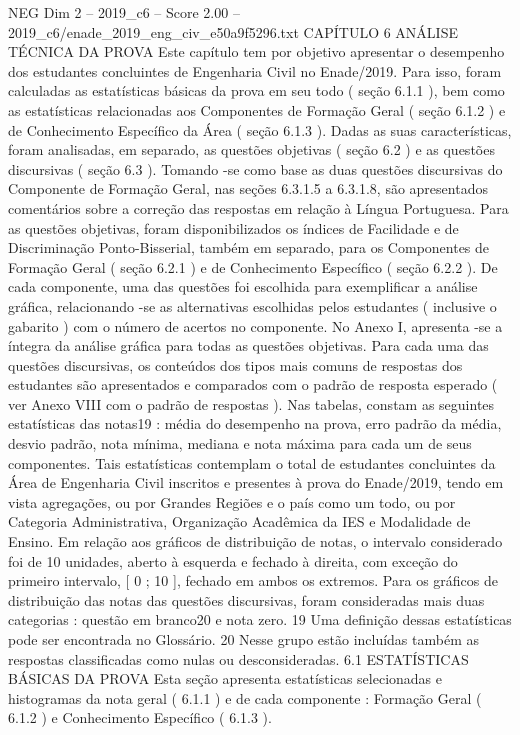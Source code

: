 \begin{textsample}{NEG Dim 2 – 2019\_c6 – Score 2.00 – 2019\_c6/enade\_2019\_eng\_civ\_e50a9f5296.txt}  \label{ex:f2_neg_282}
CAPÍTULO 6 ANÁLISE TÉCNICA DA PROVA Este capítulo tem por objetivo apresentar o desempenho dos estudantes concluintes de Engenharia Civil no Enade/2019.
Para isso, foram calculadas as estatísticas básicas da prova em seu todo ( seção 6.1.1 ), bem como as estatísticas relacionadas aos Componentes de Formação Geral ( seção 6.1.2 ) e de Conhecimento Específico da Área ( seção 6.1.3 ).
Dadas as suas características, foram analisadas, em separado, as questões objetivas ( seção 6.2 ) e as questões discursivas ( seção 6.3 ).
Tomando -se como base as duas questões discursivas do Componente de Formação Geral, nas seções 6.3.1.5 a 6.3.1.8, são apresentados comentários sobre a correção das respostas em relação à Língua Portuguesa.
Para as questões objetivas, foram disponibilizados os índices de Facilidade e de Discriminação Ponto-Bisserial, também em separado, para os Componentes de Formação Geral ( seção 6.2.1 ) e de Conhecimento Específico ( seção 6.2.2 ).
De cada componente, uma das questões foi escolhida para exemplificar a análise gráfica, relacionando -se as alternativas escolhidas pelos estudantes ( inclusive o gabarito ) com o número de acertos no componente.
No Anexo I, apresenta -se a íntegra da análise gráfica para todas as questões objetivas.
Para cada uma das questões discursivas, os conteúdos dos tipos mais comuns de respostas dos estudantes são apresentados e comparados com o padrão de resposta esperado ( ver Anexo VIII com o padrão de respostas ).
Nas tabelas, constam as seguintes estatísticas das notas19 : média do desempenho na prova, erro padrão da média, desvio padrão, nota mínima, mediana e nota máxima para cada um de seus componentes.
Tais estatísticas contemplam o total de estudantes concluintes da Área de Engenharia Civil inscritos e presentes à prova do Enade/2019, tendo em vista agregações, ou por Grandes Regiões e o país como um todo, ou por Categoria Administrativa, Organização Acadêmica da IES e Modalidade de Ensino.
Em relação aos gráficos de distribuição de notas, o intervalo considerado foi de 10 unidades, aberto à esquerda e fechado à direita, com exceção do primeiro intervalo, [ 0 ; 10 ], fechado em ambos os extremos.
Para os gráficos de distribuição das notas das questões discursivas, foram consideradas mais duas categorias : questão em branco20 e nota zero. 19 Uma definição dessas estatísticas pode ser encontrada no Glossário. 20 Nesse grupo estão incluídas também as respostas classificadas como nulas ou desconsideradas. 6.1 ESTATÍSTICAS BÁSICAS DA PROVA Esta seção apresenta estatísticas selecionadas e histogramas da nota geral ( 6.1.1 ) e de cada componente : Formação Geral ( 6.1.2 ) e Conhecimento Específico ( 6.1.3 ).

\end{textsample}
